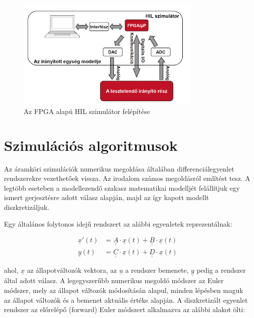 \begin{figure}[h]
	\centering
	\includegraphics[width = 0.8\textwidth]{figures/hil_idea.png}
	\caption{Az FPGA alapú HIL szimulátor felépítése} 
	\label{fig:hil_idea}
\end{figure}


\section{Szimulációs algoritmusok\cite{koki_varjasi}}

Az áramköri szimulációk numerikus megoldása általában differenciálegyenlet rendszerekre vezethetőek vissza. Az irodalom számos megoldásról említést tesz. A legtöbb eseteben a modellezendő szakasz matematikai modelljét felállítjuk egy ismert gerjesztésre adott válasz alapján, majd az így kapott modellt diszkretizáljuk.

Egy általános folytonos idejű rendszert az alábbi egyenletek reprezentálnak: 

\begin{equation}
\begin{align*}
\underline{x}'(t) &= \underline{\underline{A}}\cdot \underline{x}(t) + \underline{\underline{B}}\cdot{}\underline{x}(t) \\[0.3em]
\underline{y}(t) &= \underline{\underline{C}}\cdot \underline{x}(t) + \underline{\underline{D}}\cdot{}\underline{x}(t)
\end{align*} 
\end{equation}

ahol, $\underline{x}$ az állapotváltozók vektora, az $\underline{u}$ a rendszer bemenete, $\underline{y}$ pedig a rendszer által adott válasz.
A legegyszerűbb numerikus megoldó módszer az Euler módszer, mely az állapot változók módosításán alapul, minden lépésben maguk az állapot változók és a bemenet aktuális értéke alapján. A diszkretizált egyenlet rendszer az előrelépő (forward) Euler módszert alkalmazva az alábbi alakot ölti:

